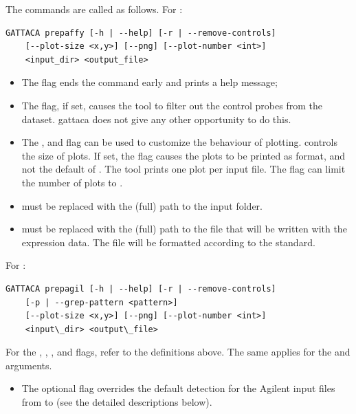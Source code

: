 The commands are called as follows. For :
\begin{lstlisting}[style=ShellStyle]
GATTACA prepaffy [-h | --help] [-r | --remove-controls]
    [--plot-size <x,y>] [--png] [--plot-number <int>]
    <input_dir> <output_file>
\end{lstlisting}

\begin{itemize}
    \item The  flag ends the command early and prints a help message;
    \item The  flag, if set, causes the tool to filter out the control probes from the dataset. \gls{gattaca} does not give any other opportunity to do this.
    \item The ,  and  flag can be used to customize the behaviour of plotting.  controls the size of plots. If set, the  flag causes the plots to be printed as  format, and not the default of . The tool prints one plot per input file. The  flag can limit the number of plots to .
    \item {} must be replaced with the (full) path to the input folder.
    \item {} must be replaced with the (full) path to the file that will be written with the expression data. The file will be formatted according to the  standard.
\end{itemize}

For :
\begin{lstlisting}[style=ShellStyle]
GATTACA prepagil [-h | --help] [-r | --remove-controls]
    [-p | --grep-pattern <pattern>]
    [--plot-size <x,y>] [--png] [--plot-number <int>]
    <input\_dir> <output\_file>
\end{lstlisting}

For the , , ,  and  flags, refer to the definitions above. The same applies for the  and  arguments.
\begin{itemize}
    \item The optional flag  overrides the default detection for the Agilent input files from  to  (see the detailed descriptions below).
\end{itemize}


